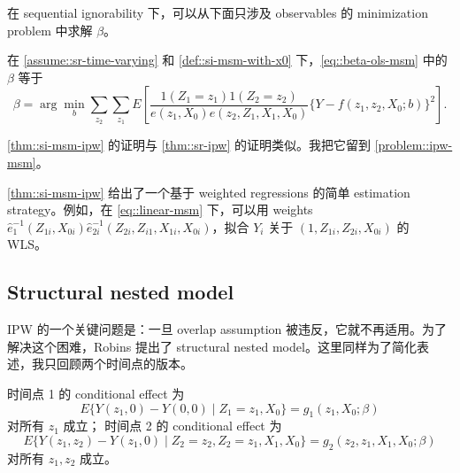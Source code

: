 在 sequential ignorability 下，可以从下面只涉及 observables 的 minimization problem 中求解 $\beta$。


\begin{theorem}
\label{thm::si-msm-ipw}
在 \cref{assume::sr-time-varying} 和 \cref{def::si-msm-with-x0} 下，\cref{eq::beta-ols-msm} 中的 $\beta$ 等于
$$
\beta = \arg\min_b \sum_{z_2}\sum_{z_1}  E\left[   \frac{  1(Z_1=z_1) 1(Z_2=z_2)   }{   e(z_1, X_0) e(z_2, Z_1, X_1, X_0)     }      
\{ Y -  f(z_1,z_2, X_0; b)  \}^2 \right] .
$$
\end{theorem}

\cref{thm::si-msm-ipw} 的证明与 \cref{thm::sr-ipw} 的证明类似。我把它留到 \cref{problem::ipw-msm}。


 \cref{thm::si-msm-ipw} 给出了一个基于 weighted regressions 的简单 estimation strategy。例如，在 \cref{eq::linear-msm} 下，可以用 weights $\hat{e}_{1}^{-1}(Z_{1i}, X_{0i})  \hat{e}_{2i}^{-1}(Z_{2i}, Z_{i1}, X_{1i}, X_{0i})$，拟合 $Y_i$ 关于 $(1,Z_{1i}, Z_{2i}, X_{0i})$ 的 WLS。

 



\subsection{Structural nested model}



IPW 的一个关键问题是：一旦 overlap assumption 被违反，它就不再适用。为了解决这个困难，Robins 提出了 structural nested model。这里同样为了简化表述，我只回顾两个时间点的版本。

\begin{definition}
\label{def::snm}
时间点 1 的 conditional effect 为
$$
E\{  Y(z_1,0) - Y(0,0) \mid  Z_1=z_1,  X_0 \} = g_1( z_1, X_0; \beta)   
$$
对所有 $z_1$ 成立；
时间点 2 的 conditional effect 为
$$
E\{  Y(z_1,z_2) - Y(z_1,0) \mid Z_2=z_2,Z_2=z_1,  X_1,  X_0 \} = g_2(z_2, z_1,  X_1,  X_0; \beta) 
$$
对所有 $ z_1, z_2$ 成立。
\end{definition}




